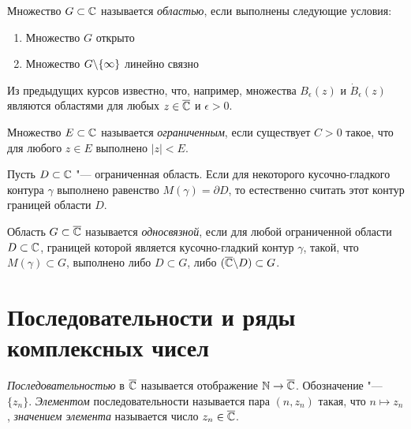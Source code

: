 \begin{definition}
	Множество $G \subset \mathbb{C}$ называется \textit{областью}, если выполнены следующие условия:
	\begin{enumerate}
		\item Множество $G$ открыто
		\item Множество $G \backslash \{\infty\}$ линейно связно
	\end{enumerate}
\end{definition}

\begin{note}
	Из предыдущих курсов известно, что, например, множества $B_\epsilon(z)$ и $\dot B_\epsilon(z)$ являются областями для любых $z \in \overline{\mathbb{C}}$ и $\epsilon > 0$.
\end{note}

\begin{definition}
	Множество $E \subset \mathbb{C}$ называется \textit{ограниченным}, если существует $C > 0$ такое, что для любого $z \in E$ выполнено $|z| < E$.
\end{definition}

\begin{note}
	Пусть $D \subset \mathbb{C}$ "--- ограниченная область. Если для некоторого кусочно-гладкого контура $\gamma$ выполнено равенство $M(\gamma) = \partial D$, то естественно считать этот контур границей области $D$.
\end{note}

\begin{definition}
	Область $G \subset \overline{\mathbb{C}}$ называется \textit{односвязной}, если для любой ограниченной области $D \subset \mathbb{C}$, границей которой является кусочно-гладкий контур $\gamma$, такой, что $M(\gamma) \subset G$, выполнено либо $D \subset G$, либо $(\overline{\mathbb{C}} \backslash D) \subset G$.
\end{definition}

\section{Последовательности и ряды комплексных чисел}

\begin{definition}
	\textit{Последовательностью} в $\overline{\mathbb{C}}$ называется отображение $\mathbb{N} \to \overline{\mathbb{C}}$. Обозначение "--- $\{z_n\}$. \textit{Элементом} последовательности называется пара $(n, z_n)$ такая, что $n \mapsto z_n$, \textit{значением элемента} называется число $z_n \in \overline{\mathbb{C}}$.
\end{definition}

